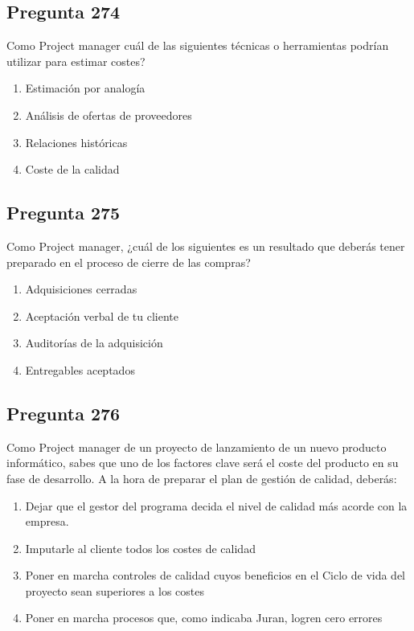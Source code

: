 \documentclass[11pt,a4paper]{article}
\begin{document}
\subsection*{Pregunta 274}
Como Project manager cuál de las siguientes técnicas o herramientas podrían utilizar para estimar costes?

\begin{enumerate}[label=\alph*)]
  \item Estimación por analogía
  \item Análisis de ofertas de proveedores
  \item Relaciones históricas
  \item Coste de la calidad
\end{enumerate}

\subsection*{Pregunta 275}
Como Project manager, ¿cuál de los siguientes es un resultado que deberás tener preparado en el proceso de cierre de las compras?

\begin{enumerate}[label=\alph*)]
  \item Adquisiciones cerradas
  \item Aceptación verbal de tu cliente
  \item Auditorías de la adquisición
  \item Entregables aceptados
\end{enumerate}

\subsection*{Pregunta 276}
Como Project manager de un proyecto de lanzamiento de un nuevo producto informático, sabes que uno de los factores clave será el coste del producto en su fase de desarrollo. A la hora de preparar el plan de gestión de calidad, deberás:

\begin{enumerate}[label=\alph*)]
  \item Dejar que el gestor del programa decida el nivel de calidad más acorde con la empresa.
  \item Imputarle al cliente todos los costes de calidad
  \item Poner en marcha controles de calidad cuyos beneficios en el Ciclo de vida del proyecto sean superiores a los costes
  \item Poner en marcha procesos que, como indicaba Juran, logren cero errores
\end{enumerate}
\end{document}
